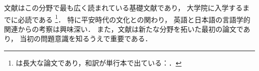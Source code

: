 \documentclass[lualatex,ja=standard,magstyle=real,12pt]{bxjsarticle}
\begin{document}
文献\autocite{hoge2000,foobar1990}はこの分野で最も広く読まれている基礎文献であり，
大学院に入学するまでに必読である
\footnote{\cite{foobar1990}は長大な論文であり，和訳が単行本で出ている：\cite{foobar1995}．}．
特に平安時代の文化との関わり\autocite[25]{hoge2000}，
英語と日本語の言語学的関連からの考察\autocite[30--35]{hoge2000}は興味深い．
また，文献\autocite{hoge2001}は新たな分野を拓いた最初の論文であり，
当初の問題意識を知るうえで重要である．
\printbibliography
\end{document}
